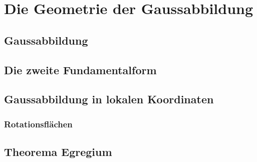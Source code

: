 \documentclass[../main.tex]{subfiles}
\begin{document}
\chapter{Die Geometrie der Gaussabbildung}

\section{Gaussabbildung}
\section{Die zweite Fundamentalform}

\section{Gaussabbildung in lokalen Koordinaten}
\subsection*{Rotationsflächen}

\section{Theorema Egregium}
\end{document}
